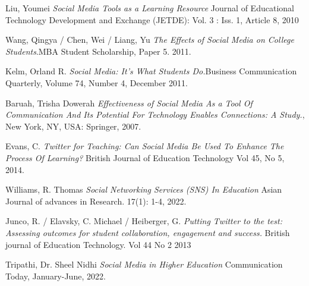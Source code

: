 \documentclass[lettersize,journal]{IEEEtran}
\begin{document}
\begin{thebibliography}{}


        Liu, Youmei {\it{Social Media Tools as a Learning Resource}} Journal of Educational Technology Development and Exchange (JETDE): Vol. 3 : Iss. 1, Article 8, 2010

        Wang, Qingya / Chen, Wei / Liang, Yu {\it{The Effects of Social Media on College Students}}.MBA Student Scholarship, Paper 5. 2011.

    Kelm, Orland R. {\it{Social Media: It's What Students Do.}}Business Communication Quarterly, Volume 74, Number 4, December 2011.

    Baruah, Trisha Dowerah {\it{Effectiveness of Social Media As a Tool Of Communication And Its Potential For Technology Enables Connections: A Study.}}, New York, NY, USA: Springer, 2007.

        Evans, C. {\it{Twitter for Teaching: Can Social Media Be Used To Enhance The Process Of Learning?}} British Journal of Education Technology
Vol 45, No 5, 2014.

        Williams, R. Thomas {\it{Social Networking Services (SNS) In Education}}
        Asian Journal of advances in Research. 17(1): 1-4, 2022.

        Junco, R. / Elavsky, C. Michael / Heiberger, G. {\it{Putting Twitter to
        the test: Assessing outcomes for student collaboration, engagement and
        success.}} British journal of Education Technology. Vol 44 No 2 2013

        Tripathi, Dr. Sheel Nidhi {\it{Social Media in Higher Education}}
        Communication Today, January-June, 2022.


\end{thebibliography}
\end{document}
